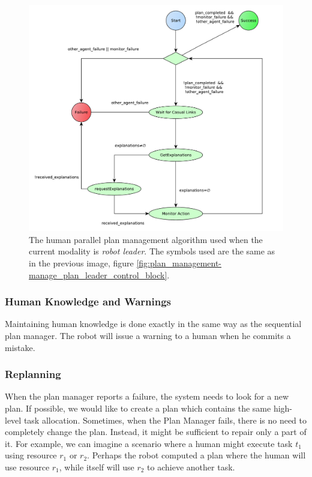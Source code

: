 \begin{figure}[ht!]
 \centering
 \includegraphics[scale=0.5]{img/plan_management/manage_plan_leader_humans.pdf}
 \caption[The human parallel plan management algorithm]{The human parallel plan management algorithm used when the current modality is \textit{robot leader}. The symbols used are the same as in the previous image, figure \ref{fig:plan_management-manage_plan_leader_control_block}.}
 \label{fig:plan_management-manage_plan_leader_humans}
 \end{figure}


\subsubsection{Human Knowledge and Warnings}
Maintaining human knowledge is done exactly in the same way as the sequential plan manager. The robot will issue a warning to a human when he commits a mistake.

\subsubsection{Replanning}
When the plan manager reports a failure, the system needs to look for a new plan. If possible, we would like to create a plan which contains the same high-level task allocation. Sometimes, when the Plan Manager fails, there is no need to completely change the plan. Instead, it might be sufficient to repair only a part of it. For example, we can imagine a scenario where a human might execute task $t_1$ using resource $r_1$ or $r_2$. Perhaps the robot computed a plan where the human will use resource $r_1$, while itself will use $r_2$ to achieve another task.

